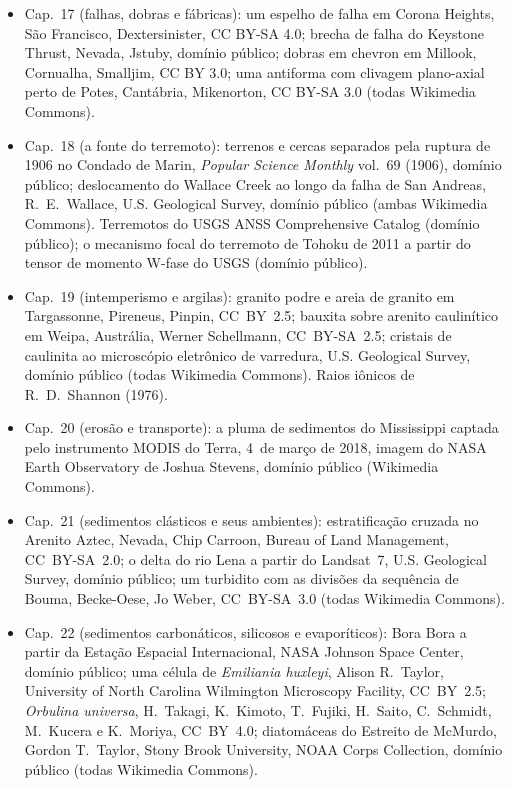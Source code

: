 \begin{itemize}
  \item Cap.~17 (falhas, dobras e fábricas): um espelho de falha em Corona Heights, São Francisco, Dextersinister, CC BY-SA 4.0; brecha de falha do Keystone Thrust, Nevada, Jstuby, domínio público; dobras em chevron em Millook, Cornualha, Smalljim, CC BY 3.0; uma antiforma com clivagem plano-axial perto de Potes, Cantábria, Mikenorton, CC BY-SA 3.0 (todas Wikimedia Commons).
  \item Cap.~18 (a fonte do terremoto): terrenos e cercas separados pela ruptura de 1906 no Condado de Marin, \emph{Popular Science Monthly} vol.~69 (1906), domínio público; deslocamento do Wallace Creek ao longo da falha de San Andreas, R.~E.~Wallace, U.S. Geological Survey, domínio público (ambas Wikimedia Commons). Terremotos do USGS ANSS Comprehensive Catalog (domínio público); o mecanismo focal do terremoto de Tohoku de 2011 a partir do tensor de momento W-fase do USGS (domínio público).
  \item Cap.~19 (intemperismo e argilas): granito podre e areia de granito em Targassonne, Pireneus, Pinpin, CC~BY~2.5; bauxita sobre arenito caulinítico em Weipa, Austrália, Werner Schellmann, CC~BY-SA~2.5; cristais de caulinita ao microscópio eletrônico de varredura, U.S. Geological Survey, domínio público (todas Wikimedia Commons). Raios iônicos de R.~D.~Shannon (1976).
  \item Cap.~20 (erosão e transporte): a pluma de sedimentos do Mississippi captada pelo instrumento MODIS do Terra, 4~de março de 2018, imagem do NASA Earth Observatory de Joshua Stevens, domínio público (Wikimedia Commons).
  \item Cap.~21 (sedimentos clásticos e seus ambientes): estratificação cruzada no Arenito Aztec, Nevada, Chip Carroon, Bureau of Land Management, CC~BY-SA~2.0; o delta do rio Lena a partir do Landsat~7, U.S. Geological Survey, domínio público; um turbidito com as divisões da sequência de Bouma, Becke-Oese, Jo Weber, CC~BY-SA~3.0 (todas Wikimedia Commons).
  \item Cap.~22 (sedimentos carbonáticos, silicosos e evaporíticos): Bora Bora a partir da Estação Espacial Internacional, NASA Johnson Space Center, domínio público; uma célula de \emph{Emiliania huxleyi}, Alison R.~Taylor, University of North Carolina Wilmington Microscopy Facility, CC~BY~2.5; \emph{Orbulina universa}, H.~Takagi, K.~Kimoto, T.~Fujiki, H.~Saito, C.~Schmidt, M.~Kucera e K.~Moriya, CC~BY~4.0; diatomáceas do Estreito de McMurdo, Gordon T.~Taylor, Stony Brook University, NOAA Corps Collection, domínio público (todas Wikimedia Commons).

\end{itemize}

